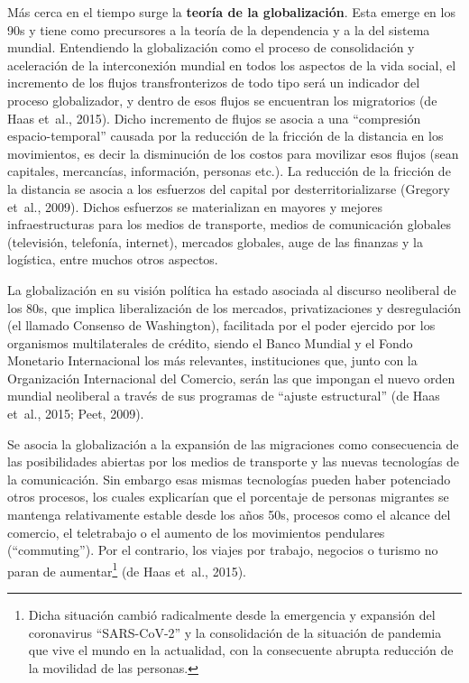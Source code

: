 \documentclass[12pt,spanish,]{article}
\begin{document}
Más cerca en el tiempo surge la \textbf{teoría de la globalización}.
Esta emerge en los 90s y tiene como precursores a la teoría de la
dependencia y a la del sistema mundial. Entendiendo la globalización
como el proceso de consolidación y aceleración de la interconexión
mundial en todos los aspectos de la vida social, el incremento de los
flujos transfronterizos de todo tipo será un indicador del proceso
globalizador, y dentro de esos flujos se encuentran los migratorios (de
Haas et~al., 2015). Dicho incremento de flujos se asocia a una
``compresión espacio-temporal'' causada por la reducción de la fricción
de la distancia en los movimientos, es decir la disminución de los
costos para movilizar esos flujos (sean capitales, mercancías,
información, personas etc.). La reducción de la fricción de la distancia
se asocia a los esfuerzos del capital por desterritorializarse (Gregory
et~al., 2009). Dichos esfuerzos se materializan en mayores y mejores
infraestructuras para los medios de transporte, medios de comunicación
globales (televisión, telefonía, internet), mercados globales, auge de
las finanzas y la logística, entre muchos otros aspectos.

La globalización en su visión política ha estado asociada al discurso
neoliberal de los 80s, que implica liberalización de los mercados,
privatizaciones y desregulación (el llamado Consenso de Washington),
facilitada por el poder ejercido por los organismos multilaterales de
crédito, siendo el Banco Mundial y el Fondo Monetario Internacional los
más relevantes, instituciones que, junto con la Organización
Internacional del Comercio, serán las que impongan el nuevo orden
mundial neoliberal a través de sus programas de ``ajuste estructural''
(de Haas et~al., 2015; Peet, 2009).

Se asocia la globalización a la expansión de las migraciones como
consecuencia de las posibilidades abiertas por los medios de transporte
y las nuevas tecnologías de la comunicación. Sin embargo esas mismas
tecnologías pueden haber potenciado otros procesos, los cuales
explicarían que el porcentaje de personas migrantes se mantenga
relativamente estable desde los años 50s, procesos como el alcance del
comercio, el teletrabajo o el aumento de los movimientos pendulares
(``commuting''). Por el contrario, los viajes por trabajo, negocios o
turismo no paran de aumentar\footnote{Dicha situación cambió
  radicalmente desde la emergencia y expansión del coronavirus
  ``SARS-CoV-2'' y la consolidación de la situación de pandemia que vive
  el mundo en la actualidad, con la consecuente abrupta reducción de la
  movilidad de las personas.} (de Haas et~al., 2015).
\end{document}
